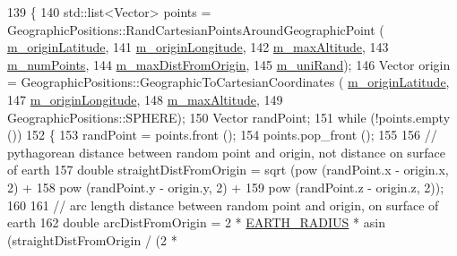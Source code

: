 \begin{DoxyCode}
139 \{  
140   std::list<Vector> points =  GeographicPositions::RandCartesianPointsAroundGeographicPoint (
      \hyperlink{classRandCartAroundGeoTestCase_a7eba973790d9c9df10e57feaf288507e}{m\_originLatitude}, 
141                                                                                              
      \hyperlink{classRandCartAroundGeoTestCase_a6d23cde2f19aba3a4487d991823fb963}{m\_originLongitude},
142                                                                                              
      \hyperlink{classRandCartAroundGeoTestCase_a0bbb663d7430e385fcb8edd28ea89618}{m\_maxAltitude}, 
143                                                                                              
      \hyperlink{classRandCartAroundGeoTestCase_ace34f05b40c38d96be98ab93a3dc208e}{m\_numPoints}, 
144                                                                                              
      \hyperlink{classRandCartAroundGeoTestCase_ae853512eccb51970f0dd3857e5e1aed8}{m\_maxDistFromOrigin},
145                                                                                              
      \hyperlink{classRandCartAroundGeoTestCase_afc6b202a99e0a36bba0d2a4c0ce7854b}{m\_uniRand});
146   Vector origin = GeographicPositions::GeographicToCartesianCoordinates (
      \hyperlink{classRandCartAroundGeoTestCase_a7eba973790d9c9df10e57feaf288507e}{m\_originLatitude}, 
147                                                                          
      \hyperlink{classRandCartAroundGeoTestCase_a6d23cde2f19aba3a4487d991823fb963}{m\_originLongitude}, 
148                                                                          
      \hyperlink{classRandCartAroundGeoTestCase_a0bbb663d7430e385fcb8edd28ea89618}{m\_maxAltitude},
149                                                                          GeographicPositions::SPHERE);
150   Vector randPoint;
151   \textcolor{keywordflow}{while} (!points.empty ())
152     \{
153       randPoint = points.front ();
154       points.pop\_front ();
155 
156       \textcolor{comment}{// pythagorean distance between random point and origin, not distance on surface of earth}
157       \textcolor{keywordtype}{double} straightDistFromOrigin = sqrt (pow (randPoint.x - origin.x, 2) + 
158                                             pow (randPoint.y - origin.y, 2) + 
159                                             pow (randPoint.z - origin.z, 2));
160 
161       \textcolor{comment}{// arc length distance between random point and origin, on surface of earth}
162       \textcolor{keywordtype}{double} arcDistFromOrigin = 2 * \hyperlink{rand-cart-around-geo-test_8cc_a2cb7703740f4124ff50163bdc2b0d1da}{EARTH\_RADIUS} * asin (straightDistFromOrigin / (2 * 

\end{DoxyCode}
